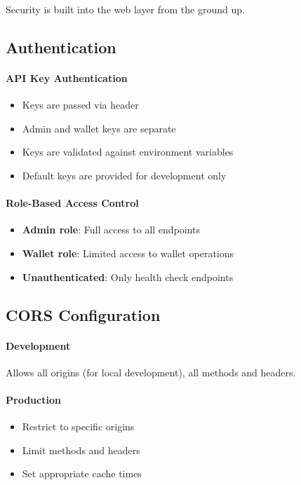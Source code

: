 Security is built into the web layer from the ground up.

\subsection{Authentication}

\paragraph{API Key Authentication}

\begin{itemize}
  \item Keys are passed via  header
  \item Admin and wallet keys are separate
  \item Keys are validated against environment variables
  \item Default keys are provided for development only
\end{itemize}

\paragraph{Role-Based Access Control}

\begin{itemize}
  \item \textbf{Admin role}: Full access to all endpoints
  \item \textbf{Wallet role}: Limited access to wallet operations
  \item \textbf{Unauthenticated}: Only health check endpoints
\end{itemize}

\subsection{CORS Configuration}

\paragraph{Development}

Allows all origins (for local development), all methods and headers.

\paragraph{Production}

\begin{itemize}
  \item Restrict to specific origins
  \item Limit methods and headers
  \item Set appropriate cache times
\end{itemize}

